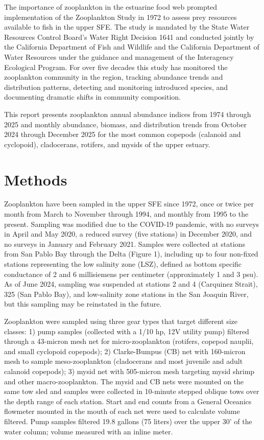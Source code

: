 \documentclass[
  letterpaper,
]{article}
\begin{document}
The importance of zooplankton in the estuarine food web prompted
implementation of the Zooplankton Study in 1972 to assess prey resources
available to fish in the upper SFE. The study is mandated by the State
Water Resources Control Board's Water Right Decision 1641 and conducted
jointly by the California Department of Fish and Wildlife and the
California Department of Water Resources under the guidance and
management of the Interagency Ecological Program. For over five decades
this study has monitored the zooplankton community in the region,
tracking abundance trends and distribution patterns, detecting and
monitoring introduced species, and documenting dramatic shifts in
community composition.

This report presents zooplankton annual abundance indices from 1974
through 2025 and monthly abundance, biomass, and distribution trends
from October 2024 through December 2025 for the most common copepods
(calanoid and cyclopoid), cladocerans, rotifers, and mysids of the upper
estuary.

\section{Methods}\label{methods}

Zooplankton have been sampled in the upper SFE since 1972, once or twice
per month from March to November through 1994, and monthly from 1995 to
the present. Sampling was modified due to the COVID-19 pandemic, with no
surveys in April and May 2020, a reduced survey (five stations) in
December 2020, and no surveys in January and February 2021. Samples were
collected at stations from San Pablo Bay through the Delta (Figure 1),
including up to four non-fixed stations representing the low salinity
zone (LSZ), defined as bottom specific conductance of 2 and 6
millisiemens per centimeter (approximately 1 and 3 psu). As of June
2024, sampling was suspended at stations 2 and 4 (Carquinez Strait), 325
(San Pablo Bay), and low-salinity zone stations in the San Joaquin
River, but this sampling may be reinstated in the future.

Zooplankton were sampled using three gear types that target different
size classes: 1) pump samples (collected with a 1/10 hp, 12V utility
pump) filtered through a 43-micron mesh net for micro-zooplankton
(rotifers, copepod nauplii, and small cyclopoid copepods); 2)
Clarke-Bumpus (CB) net with 160-micron mesh to sample meso-zooplankton
(cladocerans and most juvenile and adult calanoid copepods); 3) mysid
net with 505-micron mesh targeting mysid shrimp and other
macro-zooplankton. The mysid and CB nets were mounted on the same tow
sled and samples were collected in 10-minute stepped oblique tows over
the depth range of each station. Start and end counts from a General
Oceanics flowmeter mounted in the mouth of each net were used to
calculate volume filtered. Pump samples filtered 19.8 gallons (75
liters) over the upper 30' of the water column; volume measured with an
inline meter.
\end{document}
